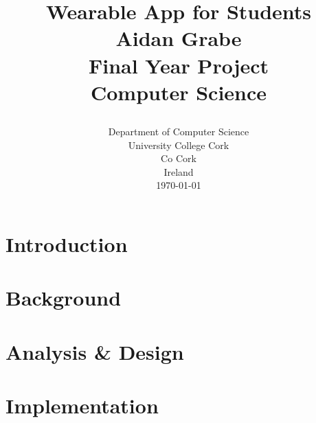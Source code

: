 \documentclass[12pt]{report}
\title{
    {\huge Wearable App for Students}\\
    {\textbf{Aidan Grabe}}\\
    {\vspace{12px}}
    {Final Year Project}\\
    {Computer Science}\\
    {\vspace{12px}}
    {\begin{figure}}
        \texttt{[image: ucc\_logo.jpg]}
    {\end{figure}}
}
\author {}
\date {
    {Department of Computer Science}\\
    {University College Cork}\\
    {Co Cork}\\
    {Ireland}\\
    {\today}
}
\begin{document}
\maketitle



\tableofcontents

\chapter{Introduction}


\chapter{Background}


\chapter{Analysis \& Design}


\chapter{Implementation}

\end{document}

